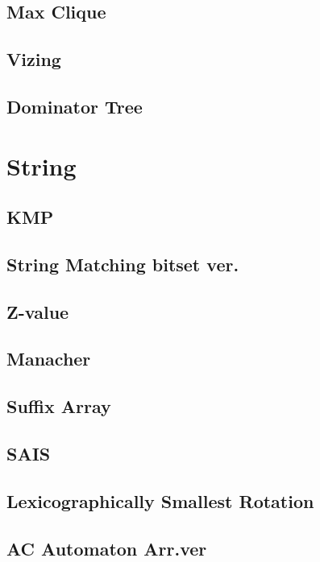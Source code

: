 \subsection{Max Clique}

\subsection{Vizing}

\subsection{Dominator Tree}


\section{String}
\subsection{KMP}

\subsection{String Matching bitset ver.}

\subsection{Z-value}

\subsection{Manacher}

\subsection{Suffix Array}

\subsection{SAIS}

\subsection{Lexicographically Smallest Rotation}

\subsection{AC Automaton Arr.ver}


